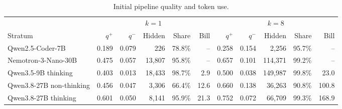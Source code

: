 
\begin{table}[t]
\caption{Initial pipeline quality and token use.}
\label{tab:quality}
\centering\small\setlength{\tabcolsep}{4pt}
\begin{tabular}{lrrrrrrrrrr}
\toprule
 & \multicolumn{5}{c}{$k=1$} & \multicolumn{5}{c}{$k=8$} \\
\cmidrule(lr){2-6}\cmidrule(lr){7-11}
Stratum & $q^+$ & $q^-$ & Hidden & Share & Bill & $q^+$ & $q^-$ & Hidden & Share & Bill \\
\midrule
Qwen2.5-Coder-7B & 0.189 & 0.079 & 226 & 78.8\% & -- & 0.258 & 0.154 & 2,256 & 95.7\% & -- \\
Nemotron-3-Nano-30B & 0.475 & 0.057 & 13,807 & 95.8\% & -- & 0.657 & 0.101 & 114,371 & 99.2\% & -- \\
Qwen3.5-9B thinking & 0.403 & 0.013 & 18,433 & 98.7\% & 2.9 & 0.500 & 0.038 & 149,987 & 99.8\% & 23.0 \\
Qwen3.8-27B non-thinking & 0.456 & 0.047 & 3,306 & 66.4\% & 12.6 & 0.660 & 0.138 & 36,263 & 90.8\% & 100.8 \\
Qwen3.8-27B thinking & 0.601 & 0.050 & 8,141 & 95.9\% & 21.3 & 0.752 & 0.072 & 66,709 & 99.3\% & 168.9 \\
\bottomrule
\end{tabular}
\end{table}

